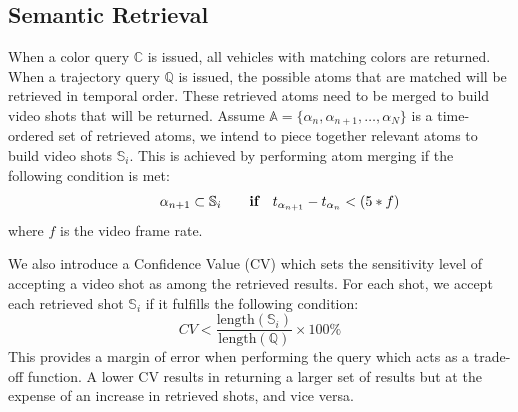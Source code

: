 \documentclass[runningheads]{llncs}
\newcommand\tab[1][1cm]{\hspace*{#1}}
\newcommand{\ian}[1]{\textcolor{red}{#1}}
\newcommand{\cc}[1]{\textcolor{teal}{#1}}
\newcommand{\ian}[1]{}   %
\newcommand{\cc}[1]{}   %
\begin{document}
\subsection{Semantic Retrieval}
  
When a color query $\mathbb{C}$ is issued, all vehicles with matching colors are returned.
When a trajectory query $\mathbb{Q}$ is issued, the possible atoms that are matched will be retrieved in temporal order. These retrieved atoms need to be merged to build video shots that will be returned.
Assume $\mathbb{A}=\{\alpha_{n},\alpha_{n+1},\ldots,\alpha_{N}\}$ is a time-ordered set of retrieved atoms, we intend to piece together relevant atoms to build video shots $\mathbb{S}_i$. This is achieved by performing atom merging if the following condition is met:
\begin{equation}
    \tab\alpha_{n+1} \subset \mathbb{S}_{i} \qquad \textbf{if}\quad t_{\alpha_{n+1}}-t_{\alpha_{n}} < (5*f) 
	\label{formula:atom_merge}
\end{equation}
where $f$ is the video frame rate.

We also introduce a Confidence Value (CV) which sets the sensitivity level of accepting a video shot as among the retrieved results.
For each shot, we accept each retrieved shot $\mathbb{S}_i$ if it fulfills the following condition:
\begin{equation}
	CV < \frac{\text{length}(\mathbb{S}_i)}{\text{length}(\mathbb{Q})} \times 100\% 
	\label{formula:searchCV}
\end{equation}
This provides a margin of error when performing the query which acts as a trade-off function. 
A lower CV results in returning a larger set of results but at the expense of an increase in retrieved shots, and vice versa. 
\end{document}
